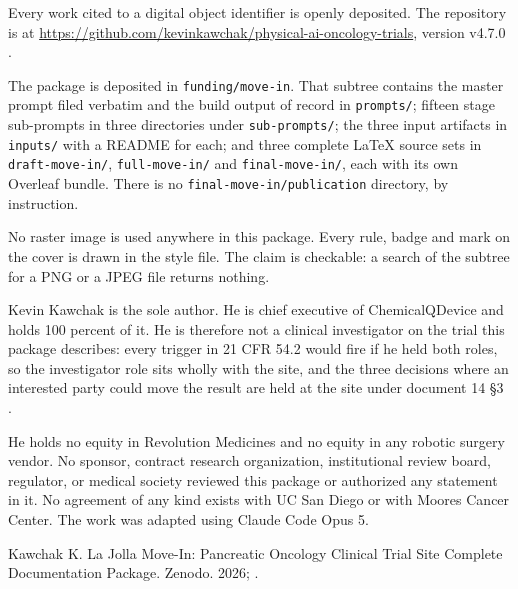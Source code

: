 
{\raggedright Every work cited to a digital object identifier is openly
deposited. The repository is at
\href{https://github.com/kevinkawchak/physical-ai-oncology-trials}{https://github.com/kevinkawchak/physical-ai-oncology-trials},
version v4.7.0 \cite{repo2026}.\par}

The package is deposited in \texttt{funding/move-in}. That subtree contains the
master prompt filed verbatim and the build output of record in
\texttt{prompts/}; fifteen stage sub-prompts in three directories under
\texttt{sub-prompts/}; the three input artifacts in \texttt{inputs/} with a
README for each; and three complete LaTeX source sets in
\texttt{draft-move-in/}, \texttt{full-move-in/} and \texttt{final-move-in/},
each with its own Overleaf bundle. There is no \texttt{final-move-in/publication}
directory, by instruction.

No raster image is used anywhere in this package. Every rule, badge and mark on
the cover is drawn in the style file. The claim is checkable: a search of the
subtree for a PNG or a JPEG file returns nothing.


Kevin Kawchak is the sole author. He is chief executive of ChemicalQDevice and
holds 100 percent of it. He is therefore not a clinical investigator on the
trial this package describes: every trigger in 21 CFR 54.2 would fire if he held
both roles, so the investigator role sits wholly with the site, and the three
decisions where an interested party could move the result are held at the site
under document 14 §3 \cite{cfr54}.

He holds no equity in Revolution Medicines and no equity in any robotic surgery
vendor. No sponsor, contract research organization, institutional review board,
regulator, or medical society reviewed this package or authorized any statement
in it. No agreement of any kind exists with UC San Diego or with Moores Cancer
Center. The work was adapted using Claude Code Opus 5.


Kawchak K. La Jolla Move-In: Pancreatic Oncology Clinical Trial Site Complete
Documentation Package. Zenodo. 2026; .

\vspace{0.2em}
\mvrule{0.5pt}
\vspace{-0.1em}

\vspace{-0.35em}
\begin{mvrefs}


\end{mvrefs}
